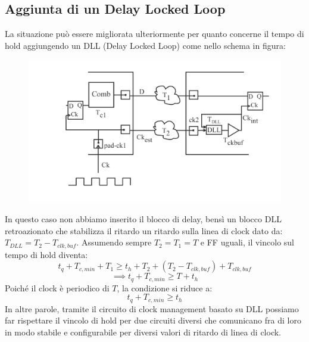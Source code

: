 \documentclass{book}
\begin{document}
        \subsection*{Aggiunta di un Delay Locked Loop}
        La situazione può essere migliorata ulteriormente per quanto concerne il tempo di hold 
        aggiungendo un DLL (Delay Locked Loop) come nello schema in figura:
        \begin{figure}[h!]
            \center  
            \includegraphics[width=0.75\linewidth]{img/chapt12img9.png}
        \end{figure}
        In questo caso non abbiamo inserito il blocco di delay, bensì un blocco DLL retroazionato che stabilizza il ritardo
        un ritardo sulla linea di clock dato da: $T_{DLL}=T_{2}-T_{clk,buf}$. Assumendo sempre $T_{2} = T_{1} = T$ e 
        FF uguali, il vincolo sul tempo di hold diventa:
        \begin{equation}
            t_{q}+T_{c,min}+T_{1} \geq t_{h}+T_{2}+(T_{2}-T_{clk, buf})+T_{clk,buf}
        \end{equation}
        \begin{equation}
            \implies t_{q}+T_{c,min} \geq T+t_{h}
        \end{equation}
        Poiché il clock è periodico di $T$, la condizione si riduce a:
        \begin{equation}
            t_{q}+T_{c,min} \geq t_{h}
        \end{equation}
        In altre parole, tramite il circuito di clock management basato su DLL possiamo far rispettare il vincolo 
        di hold per due circuiti diversi che comunicano fra di loro in modo stabile e configurabile per diversi valori di ritardo 
        di linea di clock.
\end{document}
